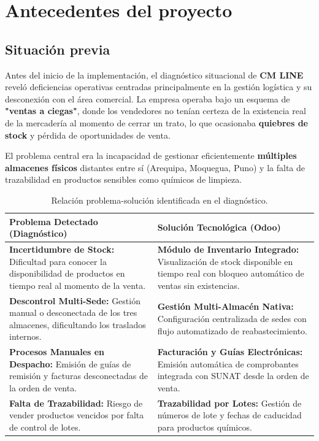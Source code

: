 \section{Antecedentes del proyecto}

\subsection{Situación previa}
Antes del inicio de la implementación, el diagnóstico situacional de \textbf{CM LINE} reveló deficiencias operativas centradas principalmente en la gestión logística y su desconexión con el área comercial. La empresa operaba bajo un esquema de \textbf{"ventas a ciegas"}, donde los vendedores no tenían certeza de la existencia real de la mercadería al momento de cerrar un trato, lo que ocasionaba \textbf{quiebres de stock} y pérdida de oportunidades de venta.

El problema central era la incapacidad de gestionar eficientemente \textbf{múltiples almacenes físicos} distantes entre sí (Arequipa, Moquegua, Puno) y la falta de trazabilidad en productos sensibles como químicos de limpieza.

\begin{table}[H]
\centering
\small
\begin{tabular}{|p{8cm}|p{8cm}|}
\hline
\textbf{Problema Detectado (Diagnóstico)} & \textbf{Solución Tecnológica (Odoo)} \\
\hline
\textbf{Incertidumbre de Stock:} Dificultad para conocer la disponibilidad de productos en tiempo real al momento de la venta.
&
\textbf{Módulo de Inventario Integrado:} Visualización de stock disponible en tiempo real con bloqueo automático de ventas sin existencias.
\\ \hline
\textbf{Descontrol Multi-Sede:} Gestión manual o desconectada de los tres almacenes, dificultando los traslados internos.
&
\textbf{Gestión Multi-Almacén Nativa:} Configuración centralizada de sedes con flujo automatizado de reabastecimiento.
\\ \hline
\textbf{Procesos Manuales en Despacho:} Emisión de guías de remisión y facturas desconectadas de la orden de venta.
&
\textbf{Facturación y Guías Electrónicas:} Emisión automática de comprobantes integrada con SUNAT desde la orden de venta.
\\ \hline
\textbf{Falta de Trazabilidad:} Riesgo de vender productos vencidos por falta de control de lotes.
&
\textbf{Trazabilidad por Lotes:} Gestión de números de lote y fechas de caducidad para productos químicos.
\\ \hline
\end{tabular}
\caption{Relación problema-solución identificada en el diagnóstico.}
\label{tab:diagnostico}
\end{table}

